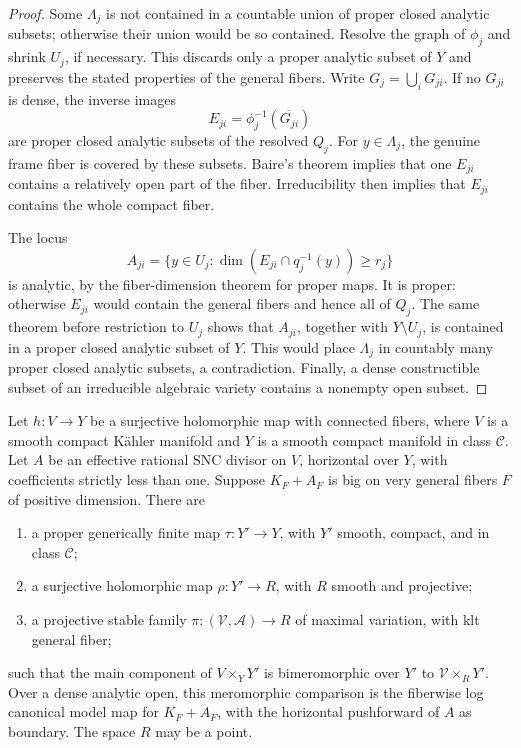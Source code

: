 \begin{proof}
Some \(\Lambda_j\) is not contained in a countable union of proper
closed analytic subsets; otherwise their union would be so contained.
Resolve the graph of \(\phi_j\) and shrink \(U_j\), if necessary.
This discards only a proper analytic subset of \(Y\) and preserves
the stated properties of the general fibers.
Write \(G_j=\bigcup_iG_{ji}\).  If no \(G_{ji}\) is dense, the inverse
images
\[
  E_{ji}=\phi_j^{-1}(\overline{G_{ji}})
\]
are proper closed analytic subsets of the resolved \(Q_j\).
For \(y\in\Lambda_j\), the genuine frame fiber is covered by these
subsets.  Baire's theorem implies that one \(E_{ji}\) contains a
relatively open part of the fiber.  Irreducibility then implies
that \(E_{ji}\) contains the whole compact fiber.

The locus
\[
  A_{ji}=\{y\in U_j:
            \dim(E_{ji}\cap q_j^{-1}(y))\geq r_j\}
\]
is analytic, by the fiber-dimension theorem for proper maps.  It is
proper: otherwise \(E_{ji}\) would contain the general fibers and
hence all of \(Q_j\).  The same theorem before restriction to \(U_j\)
shows that \(A_{ji}\), together with \(Y\setminus U_j\), is contained
in a proper closed analytic subset of \(Y\).
This would place \(\Lambda_j\) in countably many proper closed
analytic subsets, a contradiction.  Finally, a dense constructible
subset of an irreducible algebraic variety contains a nonempty
open subset.
\end{proof}
\begin{lemma}
\label{generaltype:stable-comparison}
Let \(h\colon V\to Y\) be a surjective holomorphic map with connected
fibers, where \(V\) is a smooth compact Kähler manifold and \(Y\) is
a smooth compact manifold in class \(\mathcal C\).  Let \(A\) be an
effective rational SNC divisor on \(V\), horizontal over \(Y\), with
coefficients strictly less than one.  Suppose \(K_F+A_F\) is big on
very general fibers \(F\) of positive dimension.  There are
\begin{enumerate}[label=\textup{(\roman*)}]
\item a proper generically finite map \(\tau\colon Y'\to Y\), with \(Y'\)
smooth, compact, and in class \(\mathcal C\);
\item a surjective holomorphic map \(\rho\colon Y'\to R\), with \(R\)
smooth and projective;
\item a projective stable family
\(\pi\colon(\mathcal V,\mathcal A)\to R\) of maximal variation, with klt
general fiber;
\end{enumerate}
such that the main component of \(V\times_Y Y'\) is bimeromorphic
over \(Y'\) to \(\mathcal V\times_RY'\).  Over a dense analytic open,
this meromorphic comparison is the fiberwise log canonical model map
for \(K_F+A_F\), with the horizontal pushforward of \(A\) as boundary.
The space \(R\) may be a point.
\end{lemma}

